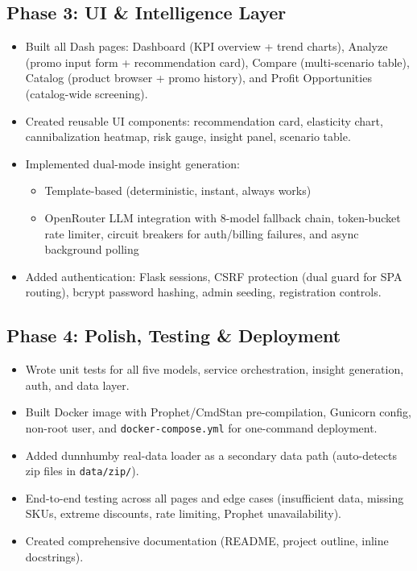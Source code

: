 \documentclass[11pt, a4paper]{article}
\begin{document}
\subsection{Phase 3: UI \& Intelligence Layer}
\begin{itemize}[leftmargin=1.5em]
    \item Built all Dash pages: Dashboard (KPI overview + trend charts), Analyze (promo input form + recommendation card), Compare (multi-scenario table), Catalog (product browser + promo history), and Profit Opportunities (catalog-wide screening).
    \item Created reusable UI components: recommendation card, elasticity chart, cannibalization heatmap, risk gauge, insight panel, scenario table.
    \item Implemented dual-mode insight generation:
    \begin{itemize}
        \item Template-based (deterministic, instant, always works)
        \item OpenRouter LLM integration with 8-model fallback chain, token-bucket rate limiter, circuit breakers for auth/billing failures, and async background polling
    \end{itemize}
    \item Added authentication: Flask sessions, CSRF protection (dual guard for SPA routing), bcrypt password hashing, admin seeding, registration controls.
\end{itemize}

\subsection{Phase 4: Polish, Testing \& Deployment}
\begin{itemize}[leftmargin=1.5em]
    \item Wrote unit tests for all five models, service orchestration, insight generation, auth, and data layer.
    \item Built Docker image with Prophet/CmdStan pre-compilation, Gunicorn config, non-root user, and \texttt{docker-compose.yml} for one-command deployment.
    \item Added dunnhumby real-data loader as a secondary data path (auto-detects zip files in \texttt{data/zip/}).
    \item End-to-end testing across all pages and edge cases (insufficient data, missing SKUs, extreme discounts, rate limiting, Prophet unavailability).
    \item Created comprehensive documentation (README, project outline, inline docstrings).
\end{itemize}
\end{document}
